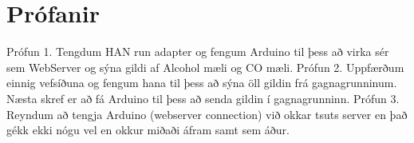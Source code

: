 \section{Prófanir}
Prófun 1. Tengdum HAN run adapter og fengum Arduino til þess að virka sér sem WebServer og sýna gildi af Alcohol mæli og CO mæli. 
Prófun 2. Uppfærðum einnig vefsíðuna og fengum hana til þess að sýna öll gildin frá gagnagrunninum. Næsta skref er að fá Arduino til þess að senda gildin í gagnagrunninn.
Prófun 3. Reyndum að tengja Arduino (webserver connection) við okkar tsuts server en það gékk ekki nógu vel en okkur miðaði áfram samt sem áður. 
   


